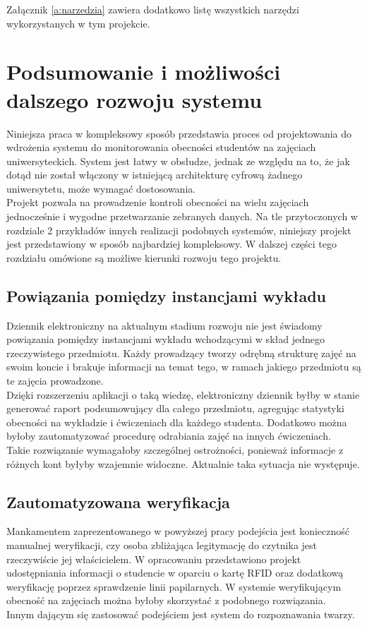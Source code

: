 \documentclass[declaration,shortabstract, mgr]{iithesis}
\begin{document}
Załącznik \ref{a:narzedzia} zawiera dodatkowo listę wszystkich narzędzi wykorzystanych w tym projekcie.

\chapter{Podsumowanie i możliwości dalszego rozwoju systemu}
\indent Niniejsza praca w kompleksowy sposób przedstawia proces od projektowania do wdrożenia systemu do monitorowania obecności studentów na zajęciach uniwersyteckich. System jest łatwy w obsłudze, jednak ze względu na to, że jak dotąd nie został włączony w istniejącą architekturę cyfrową żadnego uniwersytetu, może wymagać dostosowania. \\
\indent Projekt pozwala na prowadzenie kontroli obecności na wielu zajęciach jednocześnie i wygodne przetwarzanie zebranych danych. Na tle przytoczonych w rozdziale 2 przykładów innych realizacji podobnych systemów, niniejszy projekt jest przedstawiony w sposób najbardziej kompleksowy. W dalszej części tego rozdziału omówione są możliwe kierunki rozwoju tego projektu.

\section{Powiązania pomiędzy instancjami wykładu}
\indent Dziennik elektroniczny na aktualnym stadium rozwoju nie jest świadomy powiązania pomiędzy instancjami wykładu wchodzącymi w skład jednego rzeczywistego przedmiotu. Każdy prowadzący tworzy odrębną strukturę zajęć na swoim koncie i brakuje informacji na temat tego, w ramach jakiego przedmiotu są te zajęcia prowadzone. \\
\indent Dzięki rozszerzeniu aplikacji o taką wiedzę, elektroniczny dziennik byłby w stanie generować raport podsumowujący dla całego przedmiotu, agregując statystyki obecności na wykładzie i ćwiczeniach dla każdego studenta. Dodatkowo można byłoby zautomatyzować procedurę odrabiania zajęć na innych ćwiczeniach. \\
\indent Takie rozwiązanie wymagałoby szczególnej ostrożności, ponieważ informacje z różnych kont byłyby wzajemnie widoczne. Aktualnie taka sytuacja nie występuje.
\section{Zautomatyzowana weryfikacja}
\indent Mankamentem zaprezentowanego w powyższej pracy podejścia jest konieczność manualnej weryfikacji, czy osoba zbliżająca legitymację do czytnika jest rzeczywiście jej właścicielem. W opracowaniu \cite{fingerprint} przedstawiono projekt udostępniania informacji o studencie w oparciu o kartę RFID oraz dodatkową weryfikację poprzez sprawdzenie linii papilarnych. W systemie weryfikującym obecność na zajęciach można byłoby skorzystać z podobnego rozwiązania.\\
\indent Innym dającym się zastosować podejściem jest system do rozpoznawania twarzy.
\end{document}
